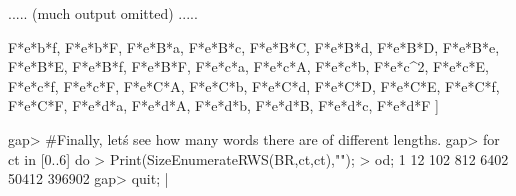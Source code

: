   .....  (much output omitted)   .....

  F*e*b*f, F*e*b*F, F*e*B*a, F*e*B*c, F*e*B*C, F*e*B*d, F*e*B*D, F*e*B*e, 
  F*e*B*E, F*e*B*f, F*e*B*F, F*e*c*a, F*e*c*A, F*e*c*b, F*e*c^2, F*e*c*E, 
  F*e*c*f, F*e*c*F, F*e*C*A, F*e*C*b, F*e*C*d, F*e*C*D, F*e*C*E, F*e*C*f, 
  F*e*C*F, F*e*d*a, F*e*d*A, F*e*d*b, F*e*d*B, F*e*d*c, F*e*d*F ]

gap> #Finally, let\'s see how many words there are of different lengths.
gap> for ct in [0..6] do
> Print(SizeEnumerateRWS(BR,ct,ct),"\n");
> od;
1
12
102
812
6402
50412
396902
gap> quit;
|
